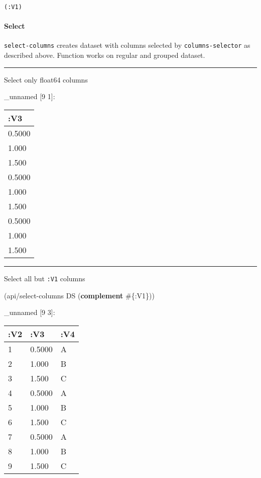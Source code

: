 \documentclass[]{article}
\newenvironment{Shaded}{\begin{snugshade}}{\end{snugshade}}
\newcommand{\KeywordTok}[1]{\textcolor[rgb]{0.13,0.29,0.53}{\textbf{#1}}}
\newcommand{\VariableTok}[1]{\textcolor[rgb]{0.00,0.00,0.00}{#1}}
\newcommand{\AttributeTok}[1]{\textcolor[rgb]{0.77,0.63,0.00}{#1}}
\newcommand{\NormalTok}[1]{#1}
\let\oldparagraph\paragraph
\renewcommand{\paragraph}[1]{\oldparagraph{#1}\mbox{}}
\begin{document}
\begin{verbatim}
(:V1)
\end{verbatim}

\paragraph{Select}\label{select}

\texttt{select-columns} creates dataset with columns selected by
\texttt{columns-selector} as described above. Function works on regular
and grouped dataset.

\begin{center}\rule{0.5\linewidth}{0.5pt}\end{center}

Select only float64 columns

\begin{Shaded}
\end{Shaded}

\_unnamed {[}9 1{]}:

\begin{longtable}[]{@{}l@{}}
\toprule
:V3\tabularnewline
\midrule
\endhead
0.5000\tabularnewline
1.000\tabularnewline
1.500\tabularnewline
0.5000\tabularnewline
1.000\tabularnewline
1.500\tabularnewline
0.5000\tabularnewline
1.000\tabularnewline
1.500\tabularnewline
\bottomrule
\end{longtable}

\begin{center}\rule{0.5\linewidth}{0.5pt}\end{center}

Select all but \texttt{:V1} columns

\begin{Shaded}
\begin{Highlighting}[]
\NormalTok{(api/select-columns DS (}\KeywordTok{complement}\NormalTok{ #\{}\AttributeTok{:V1}\NormalTok{\}))}
\end{Highlighting}
\end{Shaded}

\_unnamed {[}9 3{]}:

\begin{longtable}[]{@{}lll@{}}
\toprule
:V2 & :V3 & :V4\tabularnewline
\midrule
\endhead
1 & 0.5000 & A\tabularnewline
2 & 1.000 & B\tabularnewline
3 & 1.500 & C\tabularnewline
4 & 0.5000 & A\tabularnewline
5 & 1.000 & B\tabularnewline
6 & 1.500 & C\tabularnewline
7 & 0.5000 & A\tabularnewline
8 & 1.000 & B\tabularnewline
9 & 1.500 & C\tabularnewline
\bottomrule
\end{longtable}
\end{document}

